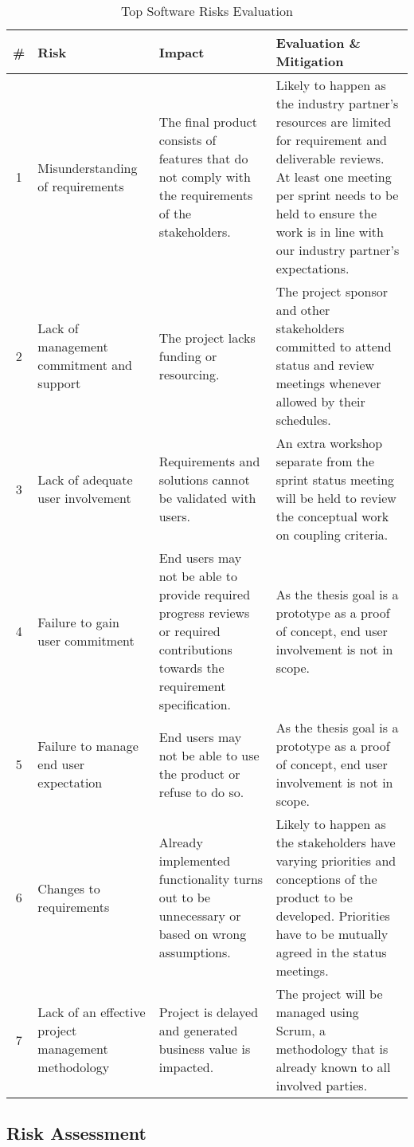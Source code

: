 \begin{table}[H]
\begin{tabular}{|c|p{80pt} p{140pt} p{140pt}|}
\hline \# & Risk & Impact & Evaluation \& Mitigation \\ 
\hline 1 & Misunderstanding of requirements & The final product consists of features that do not comply with the requirements of the stakeholders. & Likely to happen as the industry partner's resources are limited for requirement and deliverable reviews. At least one meeting per sprint needs to be held to ensure the work is in line with our industry partner's expectations.  \\ 
2 & Lack of management commitment and support & The project lacks funding or resourcing. & The project sponsor and other stakeholders committed to attend status and review meetings whenever allowed by their schedules. \\ 
3 & Lack of adequate user involvement & Requirements and solutions cannot be validated with users. & An extra workshop separate from the sprint status meeting will be held to review the conceptual work on coupling criteria.\\ 
4 & Failure to gain user commitment & End users may not be able to provide required progress reviews or required contributions towards the requirement specification. & As the thesis goal is a prototype as a proof of concept, end user involvement is not in scope. \\ 
5 & Failure to manage end user expectation & End users may not be able to use the product or refuse to do so. & As the thesis goal is a prototype as a proof of concept, end user involvement is not in scope. \\ 
6 & Changes to requirements & Already implemented functionality turns out to be unnecessary or based on wrong assumptions. & Likely to happen as the stakeholders have varying priorities and conceptions of the product to be developed. Priorities have to be mutually agreed in the status meetings. \\ 
7 & Lack of an effective project management methodology & Project is delayed and generated business value is impacted. & The project will be managed using Scrum, a methodology that is already known to all involved parties. \\ 
\hline 
\end{tabular} 
\caption{Top Software Risks Evaluation}
\label{tab:toprisks}
\end{table}

\subsection{Risk Assessment}

